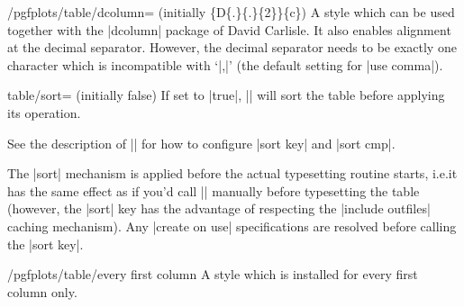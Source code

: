 \documentclass[a4paper]{ltxdoc}
\begin{document}
\begin{stylekey}{/pgfplots/table/dcolumn= (initially \{D\{.\}\{.\}\{2\}\}\{c\})}
    A style which can be used together with the |dcolumn| package of David
    Carlisle. It also enables alignment at the decimal separator. However, the
    decimal separator needs to be exactly one character which is incompatible
    with `|{,}|' (the default setting for |use comma|).
\end{stylekey}

\begin{pgfplotskey}{table/sort= (initially false)}
    If set to |true|, |\pgfplotstabletypeset| will sort the table before
    applying its operation.

    See the description of |\pgfplotstablesort| for how to configure |sort key|
    and |sort cmp|.
\begin{codeexample}[]
\end{codeexample}

    The |sort| mechanism is applied before the actual typesetting routine
    starts, i.e.\@ it has the same effect as if you'd call |\pgfplotstablesort|
    manually before typesetting the table (however, the |sort| key has the
    advantage of respecting the |include outfiles| caching mechanism). Any
    |create on use| specifications are resolved before calling the |sort key|.

\end{pgfplotskey}

\begin{stylekey}{/pgfplots/table/every first column}
    A style which is installed for every first column only.
\begin{codeexample}[narrow]
\end{codeexample}
\end{stylekey}
\end{document}
